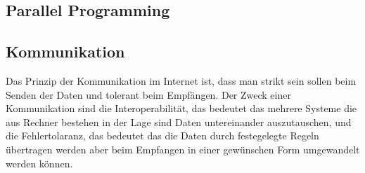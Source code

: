 \documentclass[a4paper,12pt]{article}
\begin{document}
\subsection{Parallel Programming}

\subsection{Kommunikation}
Das Prinzip der Kommunikation im Internet ist, dass man strikt sein sollen beim Senden der Daten und tolerant beim Empfängen. Der Zweck einer Kommunikation sind die Interoperabilität, das bedeutet
das mehrere Systeme die aus Rechner bestehen in der Lage sind Daten untereinander auszutauschen, und die Fehlertolaranz, das bedeutet das die Daten durch festegelegte Regeln übertragen werden aber beim Empfangen in einer
gewünschen Form umgewandelt werden können.
\end{document}
